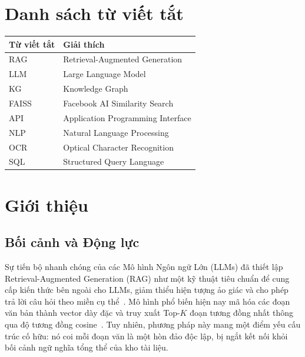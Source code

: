\documentclass[10pt, conference, a4paper]{IEEEtran}
\begin{document}
\IEEEpeerreviewmaketitle

\section*{Danh sách từ viết tắt}
\begin{center}
\begin{tabular}{@{}ll@{}}
\toprule
\textbf{Từ viết tắt} & \textbf{Giải thích} \\
\midrule
RAG & Retrieval-Augmented Generation \\
LLM & Large Language Model \\
KG & Knowledge Graph \\
FAISS & Facebook AI Similarity Search \\
API & Application Programming Interface \\
NLP & Natural Language Processing \\
OCR & Optical Character Recognition \\
SQL & Structured Query Language \\
\bottomrule
\end{tabular}
\end{center}

\section{Giới thiệu}

\subsection{Bối cảnh và Động lực}

Sự tiến bộ nhanh chóng của các Mô hình Ngôn ngữ Lớn (LLMs) đã thiết
lập Retrieval-Augmented Generation (RAG) như một kỹ thuật tiêu chuẩn
để cung cấp kiến thức bên ngoài cho LLMs, giảm thiểu hiện tượng ảo
giác và cho phép trả lời câu hỏi theo miền cụ thể~\cite{lewis2020rag,
gao2024survey}. Mô hình phổ biến hiện nay mã hóa các đoạn văn bản
thành vector dày đặc và truy xuất Top-$K$ đoạn tương đồng nhất thông
qua độ tương đồng cosine~\cite{karpukhin2020dpr}. Tuy nhiên, phương
pháp này mang một điểm yếu cấu trúc cố hữu: nó coi mỗi đoạn văn là
một hòn đảo độc lập, bị ngắt kết nối khỏi bối cảnh ngữ nghĩa tổng
thể của kho tài liệu.
\end{document}
